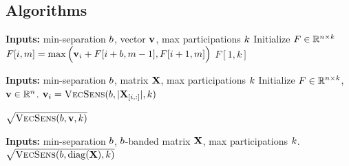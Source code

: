 \documentclass{article}
\begin{document}
\subsection{Algorithms}

\begin{algorithm}[H]
\caption{(\VecSens): Maximum of $\langle \bfv, \bfu\rangle$ where $\bfu$ is a vector in the $\ell_\infty$ unit ball satisfying $\Pi_\minsep$.}
\label{alg:minsepvectorsens}
\begin{algorithmic}%
\State \textbf{Inputs:} min-separation $\minsep$, vector $\mathbf{v}$, max participations $k$
\State Initialize $F \in \mathbb{R}^{n \times k}$
\State $F[i, m] = \max{\Big(\ensuremath{\mathbf{v}}_i + F[i+b, m-1], F[i+1, m]\Big)}$
\EndFor
\EndFor
\Return $F[1, k]$
\end{algorithmic}
\end{algorithm}

\begin{algorithm}[H]
\caption{Efficient sensitivity upper bound for \bparticipation} \label{alg:minsepsensgeneral}
\begin{algorithmic}%
\State \textbf{Inputs:} min-separation $\minsep$, matrix $\bfX$, max participations $k$
\State Initialize $F \in \mathbb{R}^{n \times k}$, $\mathbf{v} \in \mathbb{R}^n$.
\State $\mathbf{v}_i = \textsc{VecSens}(b, |\mathbf{X}_{[i, :]}|, k)$

\EndFor
\Return $\sqrt{\textsc{VecSens}(b, \mathbf{v}, k)}$
\end{algorithmic}
\end{algorithm}


\begin{algorithm}[H]
\caption{Efficient sensitivity calculation for \bparticipation, assuming $\bfX$ is $\minsep$-banded.} \label{alg:minsepsensbanded}
\begin{algorithmic}%
\State \textbf{Inputs:} min-separation $\minsep$, $\minsep$-banded matrix $\bfX$, max participations $k$.\\
\Return $\sqrt{\textsc{VecSens}(b, \operatorname{diag}(\mathbf{X}), k)}$
\end{algorithmic}
\end{algorithm}
\end{document}
